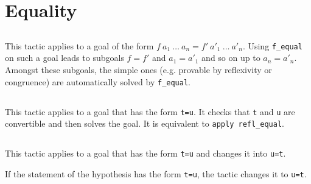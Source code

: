 \ErrMsg {}

\section{Equality}

\subsection{}
\label{f-equal}

This tactic applies to a goal of the form $f\ a_1\ \ldots\ a_n = f'\
a'_1\ \ldots\ a'_n$. Using {\tt f\_equal} on such a goal leads to
subgoals $f=f'$ and $a_1=a'_1$ and so on up to $a_n=a'_n$. Amongst
these subgoals, the simple ones (e.g. provable by
reflexivity or congruence) are automatically solved by {\tt f\_equal}.

\subsection{}
\label{reflexivity}

This tactic applies to a goal that has the form {\tt t=u}. It checks
that {\tt t} and {\tt u} are convertible and then solves the goal.
It is equivalent to {\tt apply refl\_equal}.

\begin{ErrMsgs}
\item {}
\item {}
\end{ErrMsgs}

\subsection{}

This tactic applies to a goal that has the form {\tt t=u} and changes it
into {\tt u=t}.

\begin{Variants}
\item {} 

If the statement of the hypothesis {\ident} has the form {\tt t=u},
the tactic changes it to {\tt u=t}.
\end{Variants}

\subsection{}

